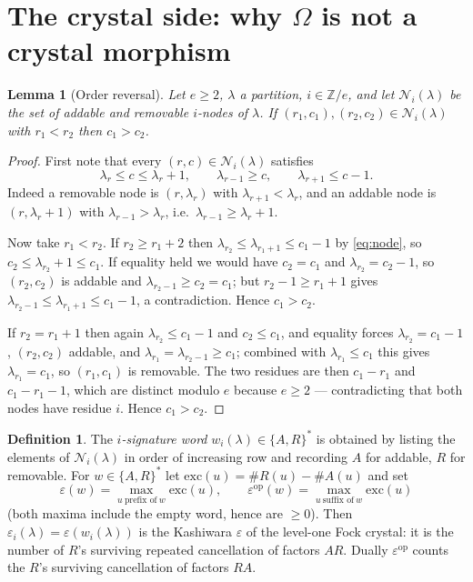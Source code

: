 \documentclass[11pt]{article}
\theoremstyle{plain}
\newtheorem{lemma}[theorem]{Lemma}
\theoremstyle{definition}
\newtheorem{definition}[theorem]{Definition}
\newcommand{\Om}{\Omega}
\begin{document}
\section{The crystal side: why $\Om$ is not a crystal morphism}
\label{sec:crystal}

\begin{lemma}[Order reversal]\label{lem:order}
Let $e\ge2$, $\lambda$ a partition, $i\in\mathbb{Z}/e$, and let
$\mathcal{N}_i(\lambda)$ be the set of addable and removable $i$-nodes of
$\lambda$.  If $(r_1,c_1),(r_2,c_2)\in\mathcal{N}_i(\lambda)$ with $r_1<r_2$
then $c_1>c_2$.
\end{lemma}

\begin{proof}
First note that every $(r,c)\in\mathcal{N}_i(\lambda)$ satisfies
\begin{equation}\label{eq:node}
  \lambda_r\le c\le\lambda_r+1,\qquad \lambda_{r-1}\ge c,\qquad
  \lambda_{r+1}\le c-1 .
\end{equation}
Indeed a removable node is $(r,\lambda_r)$ with $\lambda_{r+1}<\lambda_r$, and
an addable node is $(r,\lambda_r+1)$ with $\lambda_{r-1}>\lambda_r$, i.e.\
$\lambda_{r-1}\ge\lambda_r+1$.

Now take $r_1<r_2$.  If $r_2\ge r_1+2$ then
$\lambda_{r_2}\le\lambda_{r_1+1}\le c_1-1$ by \eqref{eq:node}, so
$c_2\le\lambda_{r_2}+1\le c_1$.  If equality held we would have
$c_2=c_1$ and $\lambda_{r_2}=c_2-1$, so $(r_2,c_2)$ is addable and
$\lambda_{r_2-1}\ge c_2=c_1$; but $r_2-1\ge r_1+1$ gives
$\lambda_{r_2-1}\le\lambda_{r_1+1}\le c_1-1$, a contradiction.  Hence
$c_1>c_2$.

If $r_2=r_1+1$ then again $\lambda_{r_2}\le c_1-1$ and $c_2\le c_1$, and
equality forces $\lambda_{r_2}=c_1-1$, $(r_2,c_2)$ addable, and
$\lambda_{r_1}=\lambda_{r_2-1}\ge c_1$; combined with $\lambda_{r_1}\le c_1$
this gives $\lambda_{r_1}=c_1$, so $(r_1,c_1)$ is removable.  The two residues
are then $c_1-r_1$ and $c_1-r_1-1$, which are distinct modulo $e$ because
$e\ge2$ --- contradicting that both nodes have residue $i$.  Hence $c_1>c_2$.
\end{proof}

\begin{definition}\label{def:word}
The \emph{$i$-signature word} $w_i(\lambda)\in\{A,R\}^*$ is obtained by
listing the elements of $\mathcal{N}_i(\lambda)$ in order of increasing row
and recording $A$ for addable, $R$ for removable.  For $w\in\{A,R\}^*$ let
$\mathrm{exc}(u)=\#R(u)-\#A(u)$ and set
\[
  \varepsilon(w)=\max_{u\ \text{prefix of}\ w}\mathrm{exc}(u),
  \qquad
  \varepsilon^{\mathrm{op}}(w)=\max_{u\ \text{suffix of}\ w}\mathrm{exc}(u)
\]
(both maxima include the empty word, hence are $\ge0$).  Then
$\varepsilon_i(\lambda)=\varepsilon(w_i(\lambda))$ is the Kashiwara
$\varepsilon$ of the level-one Fock crystal: it is the number of $R$'s
surviving repeated cancellation of factors $AR$.  Dually
$\varepsilon^{\mathrm{op}}$ counts the $R$'s surviving cancellation of factors
$RA$.
\end{definition}
\end{document}
